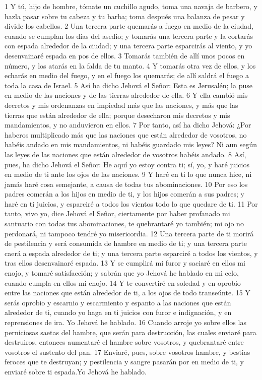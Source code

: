 1 Y tú, hijo de hombre, tómate un cuchillo agudo, toma una navaja de barbero, y hazla pasar sobre tu cabeza y tu barba; toma después una balanza de pesar y divide los cabellos.
2 Una tercera parte quemarás a fuego en medio de la ciudad, cuando se cumplan los días del asedio; y tomarás una tercera parte y la cortarás con espada alrededor de la ciudad; y una tercera parte esparcirás al viento, y yo desenvainaré espada en pos de ellos.
3 Tomarás también de allí unos pocos en número, y los atarás en la falda de tu manto.
4 Y tomarás otra vez de ellos, y los echarás en medio del fuego, y en el fuego los quemarás; de allí saldrá el fuego a toda la casa de Israel.
5 Así ha dicho Jehová el Señor: Esta es Jerusalén; la puse en medio de las naciones y de las tierras alrededor de ella.
6 Y ella cambió mis decretos y mis ordenanzas en impiedad más que las naciones, y más que las tierras que están alrededor de ella; porque desecharon mis decretos y mis mandamientos, y no anduvieron en ellos.
7 Por tanto, así ha dicho Jehová: ¿Por haberos multiplicado más que las naciones que están alrededor de vosotros, no habéis andado en mis mandamientos, ni habéis guardado mis leyes? Ni aun según las leyes de las naciones que están alrededor de vosotros habéis andado.
8 Así, pues, ha dicho Jehová el Señor: He aquí yo estoy contra ti; sí, yo, y haré juicios en medio de ti ante los ojos de las naciones.
9 Y haré en ti lo que nunca hice, ni jamás haré cosa semejante, a causa de todas tus abominaciones. 
10 Por eso los padres comerán a los hijos en medio de ti, y los hijos comerán a sus padres; y haré en ti juicios, y esparciré a todos los vientos todo lo que quedare de ti.
11 Por tanto, vivo yo, dice Jehová el Señor, ciertamente por haber profanado mi santuario con todas tus abominaciones, te quebrantaré yo también; mi ojo no perdonará, ni tampoco tendré yo misericordia.
12 Una tercera parte de ti morirá de pestilencia y será consumida de hambre en medio de ti; y una tercera parte caerá a espada alrededor de ti; y una tercera parte esparciré a todos los vientos, y tras ellos desenvainaré espada.
13 Y se cumplirá mi furor y saciaré en ellos mi enojo, y tomaré satisfacción; y sabrán que yo Jehová he hablado en mi celo, cuando cumpla en ellos mi enojo.
14 Y te convertiré en soledad y en oprobio entre las naciones que están alrededor de ti, a los ojos de todo transeúnte.
15 Y serás oprobio y escarnio y escarmiento y espanto a las naciones que están alrededor de ti, cuando yo haga en ti juicios con furor e indignación, y en reprensiones de ira. Yo Jehová he hablado.
16 Cuando arroje yo sobre ellos las perniciosas saetas del hambre, que serán para destrucción, las cuales enviaré para destruiros, entonces aumentaré el hambre sobre vosotros, y quebrantaré entre vosotros el sustento del pan.
17 Enviaré, pues, sobre vosotros hambre, y bestias feroces que te destruyan; y pestilencia y sangre pasarán por en medio de ti, y enviaré sobre ti espada.Yo Jehová he hablado.

